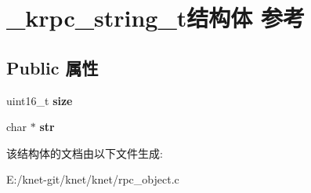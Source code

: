 \hypertarget{struct__krpc__string__t}{}\section{\+\_\+krpc\+\_\+string\+\_\+t结构体 参考}
\label{struct__krpc__string__t}
\subsection*{Public 属性}
\begin{DoxyCompactItemize}
\item 
\hypertarget{struct__krpc__string__t_aa978cf1f2cc64a2b6e066a01d0a70733}{}uint16\+\_\+t {\bfseries size}\label{struct__krpc__string__t_aa978cf1f2cc64a2b6e066a01d0a70733}

\item 
\hypertarget{struct__krpc__string__t_ad54afdfeb229e14495ac768d8fce4abc}{}char $\ast$ {\bfseries str}\label{struct__krpc__string__t_ad54afdfeb229e14495ac768d8fce4abc}

\end{DoxyCompactItemize}


该结构体的文档由以下文件生成\+:\begin{DoxyCompactItemize}
\item 
E\+:/knet-\/git/knet/knet/rpc\+\_\+object.\+c\end{DoxyCompactItemize}
